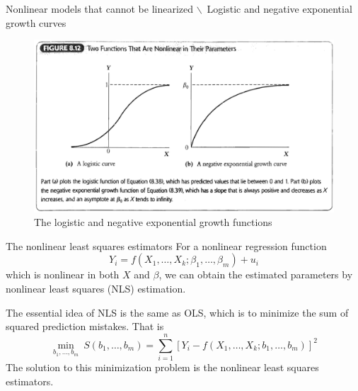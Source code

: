 \documentclass[presentation,10pt]{beamer}
\begin{document}
\begin{frame}[label={sec:orgf46bb3b}]{Nonlinear models that cannot be linearized $\backslash$\ \small Logistic and negative exponential growth curves}
\begin{figure}[htbp]
\centering
\includegraphics[width=.9\linewidth]{img/fig-8-12.png}
\caption{\label{fig:org21dd917}
The logistic and negative exponential growth functions}
\end{figure}
\end{frame}

\begin{frame}[label={sec:org3137a8e}]{The nonlinear least squares estimators}
For a nonlinear regression function
\[ Y_i = f(X_1, \ldots, X_k; \beta_1, \ldots, \beta_m) + u_i \]
which is nonlinear in both \(X\) and \(\beta\), we can obtain the
estimated parameters by \alert{nonlinear least squares} (NLS) estimation. 

\vspace{0.1cm}

The essential idea of NLS is the same as OLS, which is to minimize the sum
of squared prediction mistakes. That is
\begin{equation*}
\operatorname*{min}_{b_1, \ldots, b_m}\: S(b_1, \ldots, b_m) = \sum_{i=1}^n \left[ Y_i - f(X_1, \ldots, X_k; b_1, \ldots, b_m) \right]^2
\end{equation*}
The solution to this minimization problem is the nonlinear least
squares estimators.
\end{frame}
\end{document}
